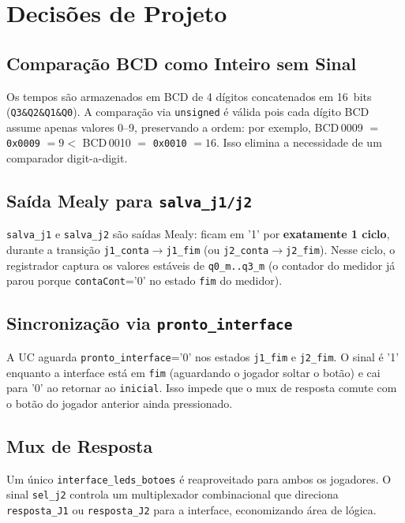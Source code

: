 \documentclass[12pt,a4paper]{article}
\begin{document}
\section{Decisões de Projeto}

\subsection{Comparação BCD como Inteiro sem Sinal}
Os tempos são armazenados em BCD de 4 dígitos concatenados em 16~bits
(\texttt{Q3\&Q2\&Q1\&Q0}). A comparação via \texttt{unsigned} é válida pois
cada dígito BCD assume apenas valores 0--9, preservando a ordem: por exemplo,
BCD\,0009 $=$ \texttt{0x0009} $= 9 <$ BCD\,0010 $=$ \texttt{0x0010} $= 16$.
Isso elimina a necessidade de um comparador digit-a-digit.

\subsection{Saída Mealy para \texttt{salva\_j1/j2}}
\texttt{salva\_j1} e \texttt{salva\_j2} são saídas Mealy: ficam em '1' por
\textbf{exatamente 1 ciclo}, durante a transição
\texttt{j1\_conta}$\to$\texttt{j1\_fim} (ou \texttt{j2\_conta}$\to$\texttt{j2\_fim}).
Nesse ciclo, o registrador captura os valores estáveis de
\texttt{q0\_m..q3\_m} (o contador do medidor já parou porque
\texttt{contaCont}='0' no estado \texttt{fim} do medidor).

\subsection{Sincronização via \texttt{pronto\_interface}}
A UC aguarda \texttt{pronto\_interface}='0' nos estados \texttt{j1\_fim} e
\texttt{j2\_fim}. O sinal é '1' enquanto a interface está em \texttt{fim}
(aguardando o jogador soltar o botão) e cai para '0' ao retornar ao
\texttt{inicial}. Isso impede que o mux de resposta comute com o botão do
jogador anterior ainda pressionado.

\subsection{Mux de Resposta}
Um único \texttt{interface\_leds\_botoes} é reaproveitado para ambos os
jogadores. O sinal \texttt{sel\_j2} controla um multiplexador combinacional
que direciona \texttt{resposta\_J1} ou \texttt{resposta\_J2} para a
interface, economizando área de lógica.
\end{document}
